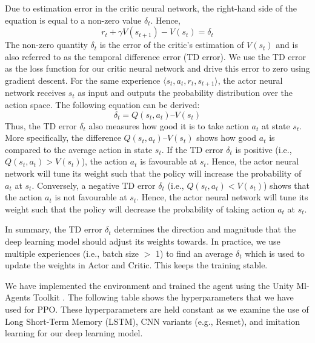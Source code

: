 \documentclass{article}
\begin{document}
Due to estimation error in the critic neural network, the right-hand side of the equation is equal to a non-zero value \( \delta_t \). Hence,
\begin{equation}
r_t + \gamma V(s_{t+1}) - V(s_t) = \delta_t
\end{equation}
The non-zero quantity \( \delta_t \) is the error of the critic’s estimation of \( V(s_t) \) and is also referred to as the temporal difference error (TD error). We use the TD error as the loss function for our critic neural network and drive this error to zero using gradient descent. For the same experience \( \langle s_t, a_t, r_t, s_{t+1} \rangle \), the actor neural network receives \( s_t \) as input and outputs the probability distribution over the action space. The following equation can be derived:
\begin{equation}
\delta_t = Q(s_t, a_t) – V(s_t)
\end{equation}
Thus, the TD error \( \delta_t \) also measures how good it is to take action \( a_t \) at state \( s_t \). More specifically, the difference \( Q(s_t, a_t) – V(s_t) \) shows how good \( a_t \) is compared to the average action in state \( s_t \). If the TD error \( \delta_t \) is positive (i.e., \( Q(s_t, a_t) > V(s_t) \)), the action \( a_t \) is favourable at \( s_t \). Hence, the actor neural network will tune its weight such that the policy will increase the probability of \( a_t \) at \( s_t \). Conversely, a negative TD error \( \delta_t \) (i.e., \( Q(s_t, a_t) < V(s_t) \)) shows that the action \( a_t \) is not favourable at \( s_t \). Hence, the actor neural network will tune its weight such that the policy will decrease the probability of taking action \( a_t \) at \( s_t \).

In summary, the TD error \( \delta_t \) determines the direction and magnitude that the deep learning model should adjust its weights towards. In practice, we use multiple experiences (i.e., batch size $>$ 1) to find an average \( \delta_t \) which is used to update the weights in Actor and Critic. This keeps the training stable.

We have implemented the environment and trained the agent using the Unity Ml-Agents Toolkit \cite{juliani2020}. The following table shows the hyperparameters that we have used for PPO. These hyperparameters are held constant as we examine the use of Long Short-Term Memory (LSTM), CNN variants (e.g., Resnet), and imitation learning for our deep learning model.
\end{document}
